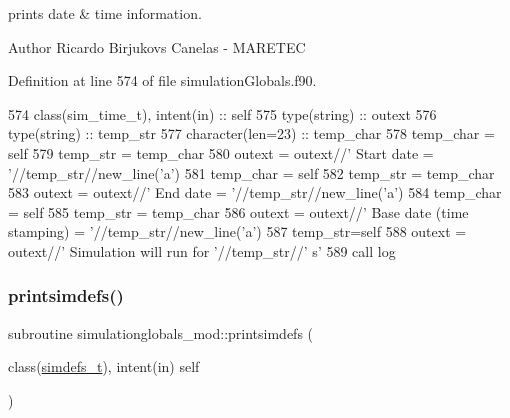prints date \& time information. 

\begin{DoxyAuthor}{Author}
Ricardo Birjukovs Canelas -\/ M\+A\+R\+E\+T\+EC 
\end{DoxyAuthor}


Definition at line 574 of file simulation\+Globals.\+f90.


\begin{DoxyCode}
574     \textcolor{keywordtype}{class}(sim\_time\_t), \textcolor{keywordtype}{intent(in)} :: self
575     \textcolor{keywordtype}{type}(string) :: outext
576     \textcolor{keywordtype}{type}(string) :: temp\_str
577     \textcolor{keywordtype}{character(len=23)} :: temp\_char
578     temp\_char = self%
579     temp\_str = temp\_char
580     outext = outext//\textcolor{stringliteral}{'      Start date                = '}//temp\_str//new\_line(\textcolor{stringliteral}{'a'})
581     temp\_char = self%
582     temp\_str = temp\_char
583     outext = outext//\textcolor{stringliteral}{'       End date                  = '}//temp\_str//new\_line(\textcolor{stringliteral}{'a'})
584     temp\_char = self%
585     temp\_str = temp\_char
586     outext = outext//\textcolor{stringliteral}{'       Base date (time stamping) = '}//temp\_str//new\_line(\textcolor{stringliteral}{'a'})
587     temp\_str=self%
588     outext = outext//\textcolor{stringliteral}{'       Simulation will run for '}//temp\_str//\textcolor{stringliteral}{' s'}
589     \textcolor{keyword}{call }log%
\end{DoxyCode}
\mbox{\label{namespacesimulationglobals__mod_a54196bff569fc838730ba39a722319ff}} 
\subsubsection{\texorpdfstring{printsimdefs()}{printsimdefs()}}
{\footnotesize\ttfamily subroutine simulationglobals\+\_\+mod\+::printsimdefs (\begin{DoxyParamCaption}\item[{class(\mbox{\hyperlink{structsimulationglobals__mod_1_1simdefs__t}{simdefs\+\_\+t}}), intent(in)}]{self }\end{DoxyParamCaption})\hspace{0.3cm}{\ttfamily [private]}}



